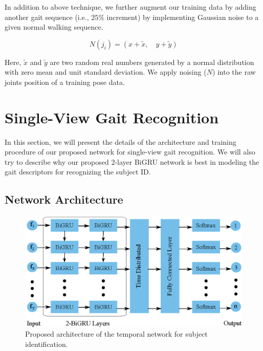 In addition to above technique, we further augment our training data by adding another gait sequence (i.e., $ 25\% $ increment) by implementing Gaussian noise to a given normal walking sequence. 

\begin{equation}
N(j_i) = (x + \tilde{x},  \quad y+ \tilde{y})
\end{equation}

Here,  $\tilde{x}$ and $\tilde{y}$ are two random real numbers generated by a normal distribution with zero mean and unit standard deviation. We apply noising ($ N $) into the raw joints position of a training pose data.



\section{Single-View Gait Recognition} \label{sec:single_view_arch}
In this section, we will present the details of the architecture and training procedure of our proposed network for single-view gait recognition. We will also try to describe why our proposed 2-layer BiGRU network is best in modeling the gait descriptors for recognizing the subject ID.

\subsection{Network Architecture}
\begin{figure}
	\centering 
	\includegraphics[width = .94\textwidth]{figures/rnn_network.eps}
	
	\caption[Proposed architecture of the temporal network for subject identificatio]
	{Proposed architecture of the temporal network for subject identification.  \label{fig:rnn_network}}
\end{figure}


